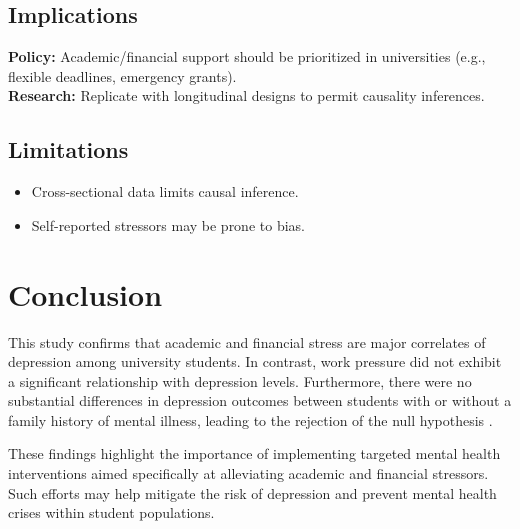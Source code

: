 \documentclass[conference]{IEEEtran}
\begin{document}
\subsection{Implications}
\textbf{Policy:} Academic/financial support should be prioritized in universities (e.g., flexible deadlines, emergency grants).\\
\textbf{Research:} Replicate with longitudinal designs to permit causality inferences.

\subsection{Limitations}
\begin{itemize}
    \item Cross-sectional data limits causal inference.
    \item Self-reported stressors may be prone to bias.
\end{itemize}

\section{Conclusion}
This study confirms that academic and financial stress are major correlates of depression among university students. In contrast, work pressure did not exhibit a significant relationship with depression levels. Furthermore, there were no substantial differences in depression outcomes between students with or without a family history of mental illness, leading to the rejection of the null hypothesis . 

These findings highlight the importance of implementing targeted mental health interventions aimed specifically at alleviating academic and financial stressors. Such efforts may help mitigate the risk of depression and prevent mental health crises within student populations.
\end{document}
